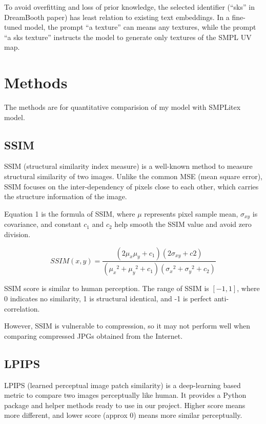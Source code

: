 \documentclass[acmtog]{acmart}
\begin{document}
To avoid overfitting and loss of prior knowledge, the selected identifier (``sks'' in DreamBooth paper) has least relation to existing text embeddings. In a fine-tuned model, the prompt ``a texture'' can means any textures, while the prompt ``a sks texture'' instructs the model to generate only textures of the SMPL UV map.

\section{Methods}

The methods are for quantitative comparision of my model with SMPLitex model.

\subsection{SSIM}

SSIM (structural similarity index measure) is a well-known method to measure structural similarity of two images. Unlike the common MSE (mean square error), SSIM focuses on the inter-dependency of pixels close to each other, which carries the structure information of the image.

Equation 1 is the formula of SSIM, where \(\mu\) represents pixel sample mean, \(\sigma_{xy}\) is covariance, and constant \(c_1\) and \(c_2\) help smooth the SSIM value and avoid zero division.

\begin{equation}
  SSIM(x,y)=\frac{(2\mu_x\mu_y+c_1)(2\sigma_{xy}+c2)}{({\mu_x}^2+{\mu_y}^2+c_1)({\sigma_x}^2+{\sigma_y}^2+c_2)}
\end{equation}

SSIM score is similar to human perception. The range of SSIM is \([-1,1]\), where 0 indicates no similarity, 1 is structural identical, and -1 is perfect anti-correlation.

However, SSIM is vulnerable to compression, so it may not perform well when comparing compressed JPGs obtained from the Internet.

\subsection{LPIPS}

LPIPS (learned perceptual image patch similarity) \cite{zhang2018unreasonable} is a deep-learning based metric to compare two images perceptually like human. It provides a Python package and helper methods ready to use in our project. Higher score means more different, and lower score (approx 0) means more similar perceptually.
\end{document}
